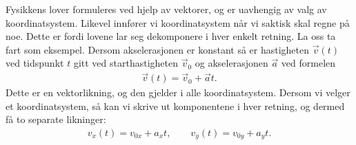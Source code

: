 Fysikkens lover formuleres ved hjelp av vektorer, og er uavhengig av valg av koordinatsystem. Likevel innfører vi koordinatsystem når vi saktisk skal regne på noe. Dette er fordi lovene lar seg dekomponere i hver enkelt retning. La oss ta fart som eksempel. Dersom akselerasjonen er konstant så er hastigheten $\vec{v}(t)$ ved tidspunkt $t$ gitt ved starthastigheten $\vec{v}_0$ og akselerasjonen $\vec{a}$ ved formelen
\begin{align}
\vec{v}(t) = \vec{v}_0 + \vec{a}t.
\end{align}
Dette er en vektorlikning, og den gjelder i alle koordinatsystem. Dersom vi velger et koordinatsystem, så kan vi skrive ut komponentene i hver retning, og dermed få to separate likninger:
\begin{align}
v_x(t) = v_{0x} + a_x t, \qquad
v_y(t) = v_{0y} + a_y t.
\end{align}







